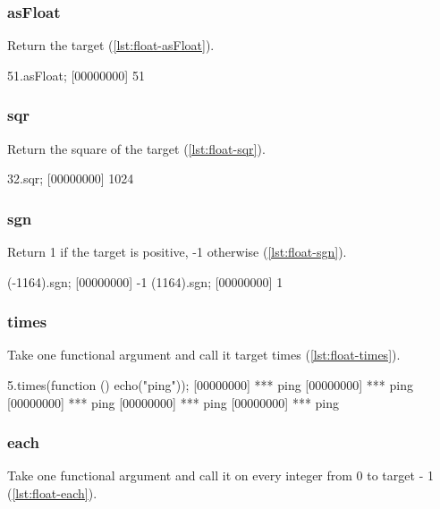 \subsubsection{asFloat}

Return the target (\autoref{lst:float-asFloat}).

\begin{urbiscript}[caption=Float.asFloat, label=lst:float-asFloat]
51.asFloat;
[00000000] 51
\end{urbiscript}

\subsubsection{sqr}

Return the square of the target (\autoref{lst:float-sqr}).

\begin{urbiscript}[caption=Float.sqr, label=lst:float-sqr]
32.sqr;
[00000000] 1024
\end{urbiscript}

\subsubsection{sgn}

Return 1 if the target is positive, -1 otherwise (\autoref{lst:float-sgn}).

\begin{urbiscript}[caption=Float.sgn, label=lst:float-sgn]
(-1164).sgn;
[00000000] -1
(1164).sgn;
[00000000] 1
\end{urbiscript}

\subsubsection{times}

Take one functional argument and call it target times
(\autoref{lst:float-times}).

\begin{urbiscript}[caption=Float.times, label=lst:float-times]
5.times(function () { echo("ping")});
[00000000] *** ping
[00000000] *** ping
[00000000] *** ping
[00000000] *** ping
[00000000] *** ping
\end{urbiscript}

\subsubsection{each}

Take one functional argument and call it on every integer from 0 to
target - 1 (\autoref{lst:float-each}).

